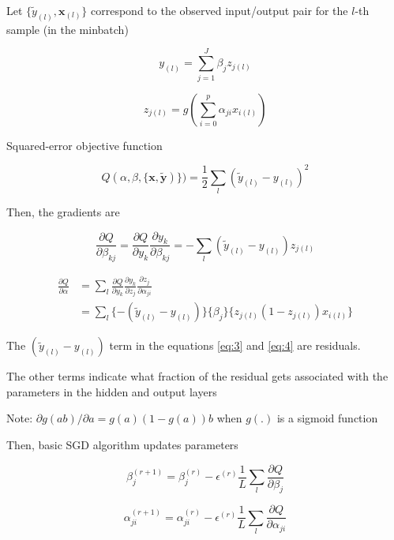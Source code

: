 \documentclass[
]{book}
\begin{document}
Let \(\{ \tilde{y}_{(l)}, \mathbf{x}_{(l)} \}\) correspond to the observed input/output pair for the \(l\)-th sample (in the minbatch)

\begin{equation}
\label{eq:1}
y_{(l)} = \sum_{j=1}^J \beta_j z_{j(l)}
\end{equation}

\begin{equation}
\label{eq:2}
z_{j(l)} = g(\sum_{i=0}^p \alpha_{ji} x_{i(l)})
\end{equation}

Squared-error objective function

\[
Q(\alpha, \beta, \{ \mathbf{x}, \mathbf{\tilde{y}}) \}) = \frac{1}{2} \sum_l (\tilde{y}_{(l)} - y_{(l)})^2
\]

Then, the gradients are

\begin{equation}
\label{eq:3}
\frac{\partial Q}{\partial \beta_{kj}} = \frac{\partial Q}{\partial y_k} \frac{\partial y_k}{\partial \beta_{kj}} = - \sum_l (\tilde{y}_{(l)} - y_{(l)}) z_{j(l)}
\end{equation}

\begin{equation}
\label{eq:4}
\begin{aligned}
\frac{\partial Q}{\partial \alpha} &= \sum_l \frac{\partial Q}{\partial y_k} \frac{\partial y_k}{\partial z_j} \frac{\partial z_j}{\partial \alpha_{ji}} \\
&= \sum_l \{- (\tilde{y}_{(l)} - y_{(l)}) \} \{\beta_j\} \{ z_{j(l)} (1 - z_{j(l)}) x_{i(l)} \}
\end{aligned}
\end{equation}

The \((\tilde{y}_{(l)} - y_{(l)})\) term in the equations \eqref{eq:3} and \eqref{eq:4} are residuals.

The other terms indicate what fraction of the residual gets associated with the parameters in the hidden and output layers

Note: \(\partial g(ab) / \partial a = g(a) (1 - g(a))b\) when \(g(.)\) is a sigmoid function

Then, basic SGD algorithm updates parameters

\begin{equation}
\label{eq:5}
\beta_{j}^{(r+1)} = \beta_j^{(r)} - \epsilon^{(r)} \frac{1}{L} \sum_l \frac{\partial Q}{\partial \beta_j}
\end{equation}

\begin{equation}
\label{eq:6}
\alpha_{ji}^{(r+1)} = \alpha_{ji}^{(r)} - \epsilon^{(r)} \frac{1}{L} \sum_l \frac{\partial Q}{\partial \alpha_{ji}}
\end{equation}
\end{document}
